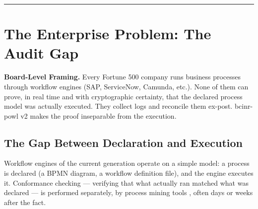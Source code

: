 \documentclass[12pt,a4paper]{article}
\theoremstyle{definition}
\theoremstyle{remark}
\newcommand{\execinsight}[2]{%
  \begin{execbox}
    \textbf{\color{chatblue}#1}\quad #2
  \end{execbox}}
\begin{document}
\begin{center}\rule{0.6\textwidth}{0.4pt}\end{center}

\tableofcontents
\clearpage

\section{The Enterprise Problem: The Audit Gap}
\label{sec:problem}

\execinsight{Board-Level Framing.}{%
Every Fortune 500 company runs business processes through workflow engines
(SAP, ServiceNow, Camunda, etc.).
None of them can prove, in real time and with cryptographic certainty,
that the declared process model was actually executed.
They collect logs and reconcile them ex-post.
bcinr-powl v2 makes the proof inseparable from the execution.}

\subsection{The Gap Between Declaration and Execution}

Workflow engines of the current generation operate on a simple model:
a process is declared (a BPMN diagram, a workflow definition file),
and the engine executes it.
Conformance checking --- verifying that what actually ran matched what was declared
--- is performed separately, by process mining tools \citep{vanderjest2016mining},
often days or weeks after the fact.
\end{document}
